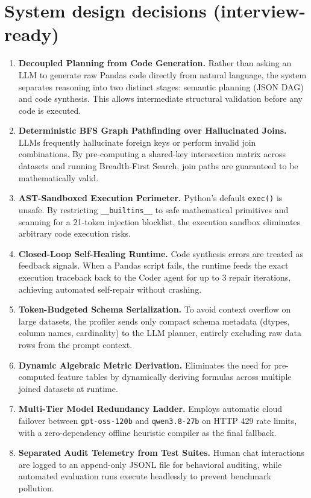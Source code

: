 \documentclass[11pt,a4paper]{article}
\begin{document}
\section{System design decisions (interview-ready)}
\begin{enumerate}[leftmargin=1.2cm]
\item \textbf{Decoupled Planning from Code Generation.} Rather than asking an LLM to generate raw Pandas code directly from natural language, the system separates reasoning into two distinct stages: semantic planning (JSON DAG) and code synthesis. This allows intermediate structural validation before any code is executed.
\item \textbf{Deterministic BFS Graph Pathfinding over Hallucinated Joins.} LLMs frequently hallucinate foreign keys or perform invalid join combinations. By pre-computing a shared-key intersection matrix across datasets and running Breadth-First Search, join paths are guaranteed to be mathematically valid.
\item \textbf{AST-Sandboxed Execution Perimeter.} Python's default \texttt{exec()} is unsafe. By restricting \texttt{\_\_builtins\_\_} to safe mathematical primitives and scanning for a 21-token injection blocklist, the execution sandbox eliminates arbitrary code execution risks.
\item \textbf{Closed-Loop Self-Healing Runtime.} Code synthesis errors are treated as feedback signals. When a Pandas script fails, the runtime feeds the exact execution traceback back to the Coder agent for up to 3 repair iterations, achieving automated self-repair without crashing.
\item \textbf{Token-Budgeted Schema Serialization.} To avoid context overflow on large datasets, the profiler sends only compact schema metadata (dtypes, column names, cardinality) to the LLM planner, entirely excluding raw data rows from the prompt context.
\item \textbf{Dynamic Algebraic Metric Derivation.} Eliminates the need for pre-computed feature tables by dynamically deriving formulas across multiple joined datasets at runtime.
\item \textbf{Multi-Tier Model Redundancy Ladder.} Employs automatic cloud failover between \texttt{gpt-oss-120b} and \texttt{qwen3.8-27b} on HTTP 429 rate limits, with a zero-dependency offline heuristic compiler as the final fallback.
\item \textbf{Separated Audit Telemetry from Test Suites.} Human chat interactions are logged to an append-only JSONL file for behavioral auditing, while automated evaluation runs execute headlessly to prevent benchmark pollution.
\end{enumerate}
\end{document}
